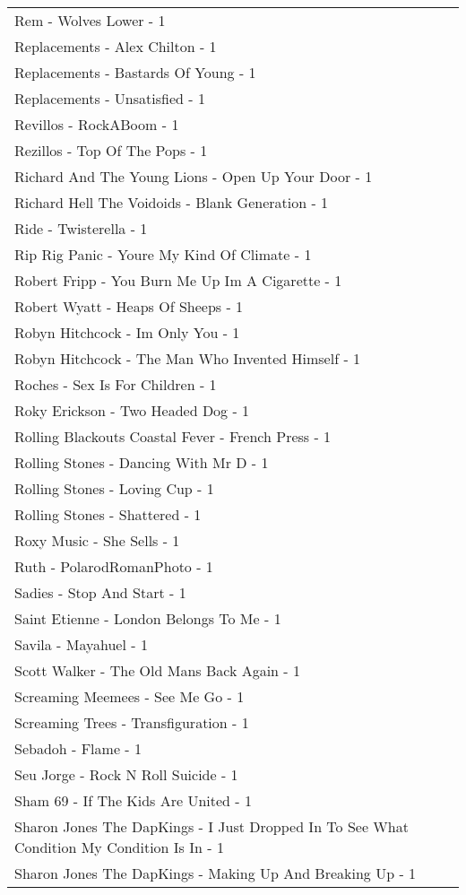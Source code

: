 \documentclass[
]{article}
\begin{document}
\begin{longtable}{l}
Rem - Wolves Lower - 1 \\ 
Replacements - Alex Chilton - 1 \\ 
Replacements - Bastards Of Young - 1 \\ 
Replacements - Unsatisfied - 1 \\ 
Revillos - RockABoom - 1 \\ 
Rezillos - Top Of The Pops - 1 \\ 
Richard And The Young Lions - Open Up Your Door - 1 \\ 
Richard Hell The Voidoids - Blank Generation - 1 \\ 
Ride - Twisterella - 1 \\ 
Rip Rig Panic - Youre My Kind Of Climate - 1 \\ 
Robert Fripp - You Burn Me Up Im A Cigarette - 1 \\ 
Robert Wyatt - Heaps Of Sheeps - 1 \\ 
Robyn Hitchcock - Im Only You - 1 \\ 
Robyn Hitchcock - The Man Who Invented Himself - 1 \\ 
Roches - Sex Is For Children - 1 \\ 
Roky Erickson - Two Headed Dog - 1 \\ 
Rolling Blackouts Coastal Fever - French Press - 1 \\ 
Rolling Stones - Dancing With Mr D - 1 \\ 
Rolling Stones - Loving Cup - 1 \\ 
Rolling Stones - Shattered - 1 \\ 
Roxy Music - She Sells - 1 \\ 
Ruth - PolarodRomanPhoto - 1 \\ 
Sadies - Stop And Start - 1 \\ 
Saint Etienne - London Belongs To Me - 1 \\ 
Savila - Mayahuel - 1 \\ 
Scott Walker - The Old Mans Back Again - 1 \\ 
Screaming Meemees - See Me Go - 1 \\ 
Screaming Trees - Transfiguration - 1 \\ 
Sebadoh - Flame - 1 \\ 
Seu Jorge - Rock N Roll Suicide - 1 \\ 
Sham 69 - If The Kids Are United - 1 \\ 
Sharon Jones The DapKings - I Just Dropped In To See What Condition My Condition Is In - 1 \\ 
Sharon Jones The DapKings - Making Up And Breaking Up - 1 \\ 

\end{longtable}
\end{document}
